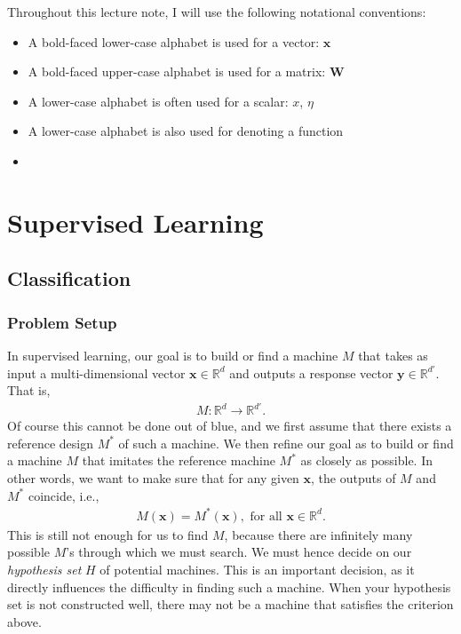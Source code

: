 \documentclass{report}
\newcommand{\vect}[1]{\mathbf{#1}}
\newcommand{\matr}[1]{\mathbf{#1}}
\newcommand{\vx}[0]{\vect{x}}
\newcommand{\vy}[0]{\vect{y}}
\newcommand{\mW}[0]{\matr{W}}
\begin{document}
Throughout this lecture note, I will use the following notational conventions:
\begin{itemize}
    \item A bold-faced lower-case alphabet is used for a vector: $\vx$
    \item A bold-faced upper-case alphabet is used for a matrix: $\mW$
    \item A lower-case alphabet is often used for a scalar: $x$, $\eta$
    \item A lower-case alphabet is also used for denoting a function
    \item 
\end{itemize}


\chapter{Supervised Learning}
\label{chap:supervised}

\section{Classification}
\label{sec:classification}

\subsection{Problem Setup}

In supervised learning, our goal is to build or find a machine $M$ that takes as
input a multi-dimensional vector $\vx \in \mathbb{R}^d$ and outputs a response
vector $\vy \in \mathbb{R}^{d'}$.  That is,
\begin{align*}
    M: \mathbb{R}^d \to \mathbb{R}^{d'}.
\end{align*}
Of course this cannot be done out of blue, and we first assume that there exists
a reference design $M^*$ of such a machine.  We then refine our goal as to build
or find a machine $M$ that imitates the reference machine $M^*$ as closely as
possible. In other words, we want to make sure that for any given $\vx$, the
outputs of $M$ and $M^*$ coincide, i.e.,
\begin{align}
    \label{eq:classification0}
    M(\vx) = M^*(\vx),\text{ for all } \vx \in \mathbb{R}^d.
\end{align}
This is still not enough for us to find $M$, because there are infinitely many
possible $M$'s through which we must search. We must hence decide on our {\it
hypothesis set} $H$ of potential machines. This is an important decision, as it
directly influences the difficulty in finding such a machine. When your
hypothesis set is not constructed well, there may not be a machine that
satisfies the criterion above. 
\end{document}
